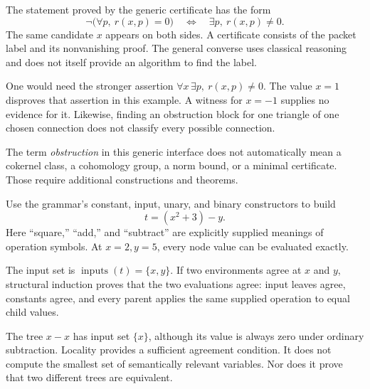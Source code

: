The statement proved by the generic certificate has the form
\[
\neg\bigl(\forall p,\ r(x,p)=0\bigr)
\quad\Longleftrightarrow\quad
\exists p,\ r(x,p)\ne0.
\]
The same candidate $x$ appears on both sides. A certificate consists of the packet label and its nonvanishing proof. The general converse uses classical reasoning and does not itself provide an algorithm to find the label.

One would need the stronger assertion $\forall x\,\exists p,\ r(x,p)\ne0$. The value $x=1$ disproves that assertion in this example. A witness for $x=-1$ supplies no evidence for it. Likewise, finding an obstruction block for one triangle of one chosen connection does not classify every possible connection.

The term \emph{obstruction} in this generic interface does not automatically mean a cokernel class, a cohomology group, a norm bound, or a minimal certificate. Those require additional constructions and theorems.


Use the grammar's constant, input, unary, and binary constructors to build
\[
t=(x^2+3)-y.
\]
Here ``square,'' ``add,'' and ``subtract'' are explicitly supplied meanings of operation symbols. At $x=2,y=5$, every node value can be evaluated exactly.


The input set is $\operatorname{inputs}(t)=\{x,y\}$. If two environments agree at $x$ and $y$, structural induction proves that the two evaluations agree: input leaves agree, constants agree, and every parent applies the same supplied operation to equal child values.

The tree $x-x$ has input set $\{x\}$, although its value is always zero under ordinary subtraction. Locality provides a sufficient agreement condition. It does not compute the smallest set of semantically relevant variables. Nor does it prove that two different trees are equivalent.


